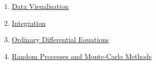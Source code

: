 \begin{enumerate}
	\item \hyperlink{section.2}{Data Visualisation}
	\item \hyperlink{section.3}{Integration}
	\item \hyperlink{section.4}{Ordinary Differential Equations}
	\item \hyperlink{section.5}{Random Processes and Monte-Carlo Methods}
	
\end{enumerate}